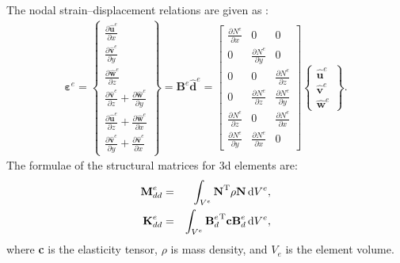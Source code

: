The nodal strain--displacement relations are given as \cite{kudela20093d}:
\begin{eqnarray}
	\boldsymbol{\varepsilon}^e = 
	\left \{ \begin{array}{c}
		\frac{\partial \widehat{\textbf{u}}^e}{\partial x} \\
		\frac{\partial \widehat{\textbf{v}}^e}{\partial y} \\
		\frac{\partial \widehat{\textbf{w}}^e}{\partial z} \\
		\frac{\partial \widehat{\textbf{v}}^e}{\partial z} + \frac{\partial \widehat{\textbf{w}}^e}{\partial y}\\
		\frac{\partial \widehat{\textbf{u}}^e}{\partial z} + \frac{\partial \widehat{\textbf{w}}^e}{\partial x}\\
		\frac{\partial \widehat{\textbf{v}}^e}{\partial y} + \frac{\partial \widehat{\textbf{v}}^e}{\partial x}
	\end{array} \right\} = \textbf{B}^e\widehat{\textbf{d}}^e =
	\left [
	\begin{array}{ccc}
		\frac{\partial N^e}{\partial x} & 0 & 0\\
		0 & \frac{\partial N^e}{\partial y} & 0\\
		0 & 0 & \frac{\partial N^e}{\partial z}\\
		0 & \frac{\partial N^e}{\partial z} & \frac{\partial N^e}{\partial y}\\
		\frac{\partial N^e}{\partial z} & 0 & \frac{\partial N^e}{\partial x}\\
		\frac{\partial N^e}{\partial y} & \frac{\partial N^e}{\partial x} & 0
	\end{array} \right]
	\left \{ \begin{array}{c}
		\widehat{\textbf{u}}^e \\
		\widehat{\textbf{v}}^e \\
		\widehat{\textbf{w}}^e
	\end{array} \right\}.
\end{eqnarray}
The formulae of the structural matrices for \ac{3d} elements are:
\begin{eqnarray}
	\textbf{M}_{dd}^e & = & \int_{V^e}\textbf{N}^{\mathrm{T}}\rho \textbf{N} \mathop{}\!\mathrm{d} V^e,\\
	\textbf{K}_{dd}^e & = & \int_{V^e}{\textbf{B}_d^e}^{\mathrm{T}}\textbf{c}\textbf{B}_d^e \mathop{}\!\mathrm{d} V^e,
\end{eqnarray}
%
where \textbf{c} is the elasticity tensor, \(\rho\) is mass density, and \(V_e\) is the element volume.